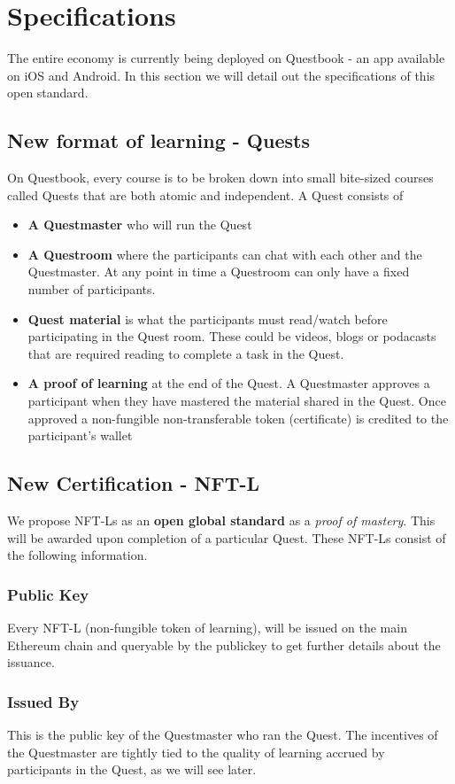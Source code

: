 \documentclass{article}
\begin{document}
  \section{Specifications}
    The entire economy is currently being deployed on Questbook - an app available on iOS and Android. In this section we will detail out the specifications of this open standard.
    \subsection{New format of learning - Quests}
      On Questbook, every course is to be broken down into small bite-sized courses called Quests that are both atomic and independent.
      A Quest consists of 
      \begin{itemize}
        \item \textbf{A Questmaster} who will run the Quest
        \item \textbf{A Questroom} where the participants can chat with each other and the Questmaster. At any point in time a Questroom can only have  a fixed number of participants.
        \item \textbf{Quest material} is what the participants must read/watch before participating in the Quest room. These could be videos, blogs or podacasts that are required reading to complete a task in the Quest.
        \item \textbf{A proof of learning} at the end of the Quest. A Questmaster approves a participant when they have mastered the material shared in the Quest. Once approved a non-fungible non-transferable token (certificate) is credited to the participant's wallet
      \end{itemize}
    \subsection{New Certification - NFT-L}
      We propose NFT-Ls as an \textbf{open global standard} as a \textit{proof of mastery}. This will be awarded upon completion of a particular Quest. These NFT-Ls consist of the following information.
      \subsubsection{Public Key}
        Every NFT-L (non-fungible token of learning), will be issued on the main Ethereum chain and queryable by the publickey to get further details about the issuance.
      \subsubsection{Issued By}
        This is the public key of the Questmaster who ran the Quest. The incentives of the Questmaster are tightly tied to the quality of learning accrued by participants in the Quest, as we will see later. 
\end{document}
